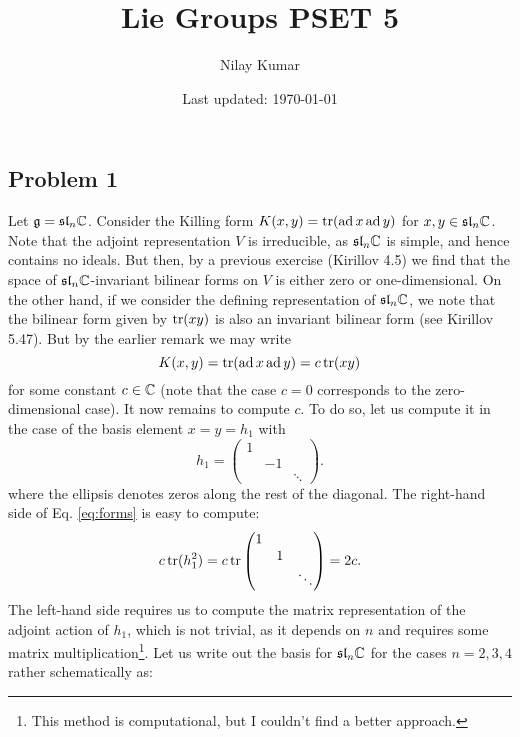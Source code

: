 \documentclass{../../mathnotes}
\title{Lie Groups PSET 5}
\author{Nilay Kumar}
\date{Last updated: \today}
\begin{document}
\maketitle

\subsection*{Problem 1}

Let $\mathfrak g=\mathfrak{sl}_n\mathbb{C}$. Consider the Killing form $K(x,y)=\operatorname{tr}(\operatorname{ad} x\operatorname{ad} y)$ for $x,y\in\mathfrak{sl}_n\mathbb{C}$.
Note that the adjoint representation $V$ is irreducible, as $\mathfrak{sl}_n\mathbb{C}$ is simple, and hence contains no ideals.
But then, by a previous exercise (Kirillov 4.5) we find that the space of $\mathfrak{sl}_n\mathbb{C}$-invariant bilinear forms on $V$
is either zero or one-dimensional. On the other hand, if we consider the defining representation of $\mathfrak{sl}_n\mathbb{C}$,
we note that the bilinear form given by $\operatorname{tr}(xy)$ is also an invariant bilinear form (see Kirillov 5.47). But by
the earlier remark we may write
\begin{equation}
    K(x,y)=\operatorname{tr}(\operatorname{ad} x\operatorname{ad} y)=c\operatorname{tr}(xy)
    \label{eq:forms}
\end{equation}
for some constant $c\in\mathbb{C}$ (note that the case $c=0$ corresponds to the zero-dimensional case). It now remains
to compute $c$. To do so, let us compute it in the case of the basis element $x=y=h_1$ with
\begin{equation*}
    h_1=\begin{pmatrix}
        1&&\\&-1&\\&&\ddots
    \end{pmatrix}.
\end{equation*}
where the ellipsis denotes zeros along the rest of the diagonal.
The right-hand side of Eq. \ref{eq:forms} is easy to compute:
\begin{align*}
    c\operatorname{tr}(h_1^2)=c\operatorname{tr}
    \begin{pmatrix}
        1&&\\&1&\\&&\ddots
    \end{pmatrix}
    =2c.
\end{align*}
The left-hand side requires us to compute the matrix representation of the adjoint action of $h_1$, which is not trivial,
as it depends on $n$ and requires some matrix multiplication\footnote{This method is computational, but I couldn't find a better approach.}.
Let us write out the basis for $\mathfrak{sl}_n\mathbb{C}$ for the cases $n=2,3,4$ rather schematically as:
\end{document}
